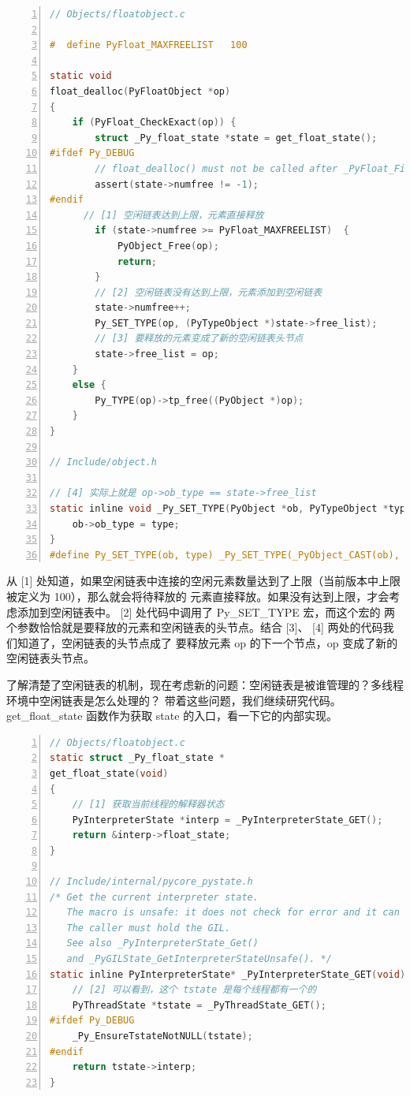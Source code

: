 \begin{lstlisting}[language=C, numbers=left, numbersep=1em, numberstyle=\footnotesize , breaklines=true]
// Objects/floatobject.c

#  define PyFloat_MAXFREELIST   100

static void
float_dealloc(PyFloatObject *op)
{
    if (PyFloat_CheckExact(op)) {
        struct _Py_float_state *state = get_float_state();
#ifdef Py_DEBUG
        // float_dealloc() must not be called after _PyFloat_Fini()
        assert(state->numfree != -1);
#endif
	  // [1] 空闲链表达到上限，元素直接释放
        if (state->numfree >= PyFloat_MAXFREELIST)  {
            PyObject_Free(op);
            return;
        }
        // [2] 空闲链表没有达到上限，元素添加到空闲链表
        state->numfree++;
        Py_SET_TYPE(op, (PyTypeObject *)state->free_list);
        // [3] 要释放的元素变成了新的空闲链表头节点
        state->free_list = op;
    }
    else {
        Py_TYPE(op)->tp_free((PyObject *)op);
    }
}

// Include/object.h

// [4] 实际上就是 op->ob_type == state->free_list
static inline void _Py_SET_TYPE(PyObject *ob, PyTypeObject *type) {
    ob->ob_type = type;
}
#define Py_SET_TYPE(ob, type) _Py_SET_TYPE(_PyObject_CAST(ob), type)
\end{lstlisting}

从 [1] 处知道，如果空闲链表中连接的空闲元素数量达到了上限（当前版本中上限被定义为 100），那么就会将待释放的
元素直接释放。如果没有达到上限，才会考虑添加到空闲链表中。 [2] 处代码中调用了 Py\_SET\_TYPE 宏，而这个宏的
两个参数恰恰就是要释放的元素和空闲链表的头节点。结合 [3]、 [4] 两处的代码我们知道了，空闲链表的头节点成了
要释放元素 op 的下一个节点，op 变成了新的空闲链表头节点。


了解清楚了空闲链表的机制，现在考虑新的问题：空闲链表是被谁管理的？多线程环境中空闲链表是怎么处理的？
带着这些问题，我们继续研究代码。get\_float\_state 函数作为获取 state 的入口，看一下它的内部实现。

\begin{lstlisting}[language=C, numbers=left, numbersep=1em, numberstyle=\footnotesize , breaklines=true]
// Objects/floatobject.c
static struct _Py_float_state *
get_float_state(void)
{
    // [1] 获取当前线程的解释器状态
    PyInterpreterState *interp = _PyInterpreterState_GET();
    return &interp->float_state;
}

// Include/internal/pycore_pystate.h
/* Get the current interpreter state.
   The macro is unsafe: it does not check for error and it can return NULL.
   The caller must hold the GIL.
   See also _PyInterpreterState_Get()
   and _PyGILState_GetInterpreterStateUnsafe(). */
static inline PyInterpreterState* _PyInterpreterState_GET(void) {
	// [2] 可以看到，这个 tstate 是每个线程都有一个的
    PyThreadState *tstate = _PyThreadState_GET();
#ifdef Py_DEBUG
    _Py_EnsureTstateNotNULL(tstate);
#endif
    return tstate->interp;
}
\end{lstlisting}

